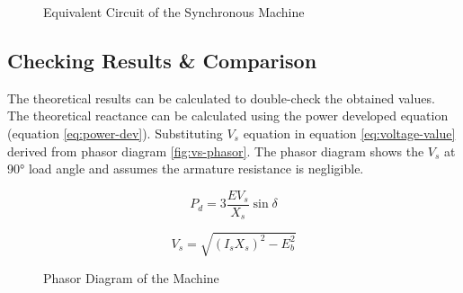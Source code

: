\documentclass[12pt]{article}
\begin{document}
\begin{figure}[H]
    \centering
    \caption{Equivalent Circuit of the Synchronous Machine}
    \label{fig:eq-circuit-results}
\end{figure}

\FloatBarrier

\subsection{Checking Results \& Comparison}

The theoretical results can be calculated to double-check the obtained values. The theoretical reactance can be calculated using the power developed equation (equation \ref{eq:power-dev}). Substituting $V_{s}$ equation in equation \ref{eq:voltage-value} derived from phasor diagram \ref{fig:vs-phasor}. The phasor diagram shows the $V_{s}$ at \ang{90} load angle and assumes the armature resistance is negligible.

\begin{equation} \label{eq:power-dev}
    P_{d} = 3 \frac{E V_{s}}{X_{s}} \sin{\delta}
\end{equation}

\begin{equation} \label{eq:voltage-value}
    V_{s} = \sqrt{(I_{s} X_{s})^{2} - E_{b}^{2}}
\end{equation}

\begin{figure}[H]
    \centering
    \caption{Phasor Diagram of the Machine}
\end{figure}
\end{document}
